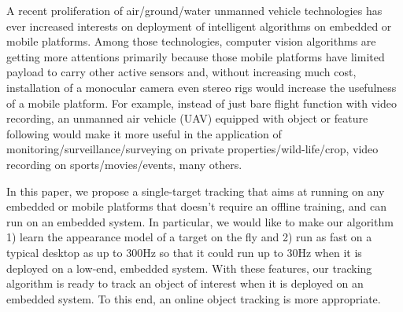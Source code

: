 \documentclass[10pt,twocolumn,letterpaper]{article}
\newcounter{ct}
\begin{document}

A recent proliferation of air/ground/water unmanned vehicle
technologies has ever increased interests on deployment of intelligent
algorithms on embedded or mobile platforms. Among those technologies,
computer vision algorithms are getting more attentions primarily
because those mobile platforms have limited payload to carry other
active sensors and, without increasing much cost, installation of a
monocular camera even stereo rigs would increase the usefulness of a
mobile platform. For example, instead of just bare flight function
with video recording, an unmanned air vehicle (UAV) equipped with
object or feature following would make it more useful in the
application of monitoring/surveillance/surveying on private
properties/wild-life/crop, video recording on sports/movies/events,
many others. 

In this paper, we propose a single-target tracking that aims at
running on any embedded or mobile platforms that doesn't require an
offline training, and can run on an embedded system. In particular, we
would like to make our algorithm 1) learn the appearance model of a
target on the fly and 2) run as fast on a typical desktop as up to
300Hz so that it could run up to 30Hz when it is deployed on a
low-end, embedded system. With these features, our tracking algorithm
is ready to track an object of interest when it is deployed on an
embedded system. To this end, an online object tracking is more
appropriate.
\end{document}
